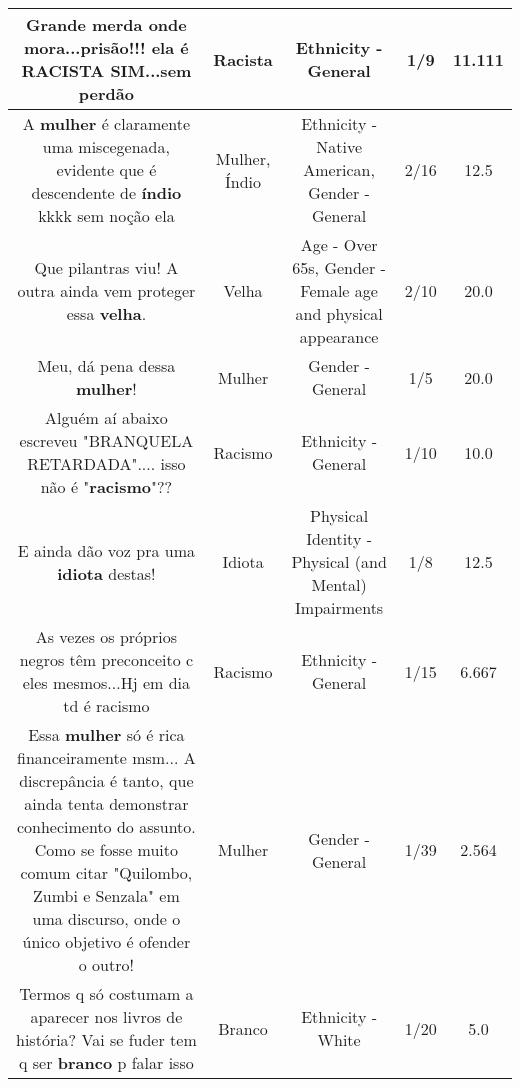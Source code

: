 \documentclass[11pt]{article}
\newlength\mylength
\begin{document}
\begin{center}
\begin{longtable}{|C{.65\mylength}|C{.30\mylength}|C{.12\mylength}|C{.12\mylength}|C{.12\mylength}|}
  \small Grande merda onde mora...prisão!!! ela é  \textbf{RACISTA} SIM...sem perdão\normalsize   & Racista & Ethnicity - General & 1/9 & 11.111 \\  \hline
  \small A \textbf{mulher} é claramente uma miscegenada, evidente que é descendente de \textbf{índio} kkkk sem noção ela\normalsize   & Mulher, Índio & Ethnicity - Native American, Gender - General & 2/16 & 12.5 \\  \hline
  \small Que pilantras viu! A outra ainda vem proteger essa \textbf{v\textbf{elha}}.\normalsize   & Velha & Age - Over 65s, Gender - Female age and physical appearance & 2/10 & 20.0 \\  \hline
  \small Meu, dá pena dessa \textbf{mulher}!\normalsize   & Mulher & Gender - General & 1/5 & 20.0 \\  \hline
  \small Alguém aí abaixo escreveu "BRANQUELA RETARDADA".... isso não é "\textbf{racismo}"??\normalsize   & Racismo & Ethnicity - General & 1/10 & 10.0 \\  \hline
  \small E ainda dão voz pra uma \textbf{idiota} destas!\normalsize   & Idiota & Physical Identity - Physical (and Mental) Impairments & 1/8 & 12.5 \\  \hline
  \small As vezes os próprios negros têm preconceito c eles mesmos...Hj em dia td é racismo\normalsize   & Racismo & Ethnicity - General & 1/15 & 6.667 \\  \hline
  \small Essa \textbf{mulher} só é rica financeiramente msm... A discrepância é tanto, que ainda tenta demonstrar conhecimento do assunto. Como se fosse muito comum citar "Quilombo, Zumbi e Senzala" em uma discurso, onde o único objetivo é ofender o outro!\normalsize   & Mulher & Gender - General & 1/39 & 2.564 \\  \hline
  \small Termos q só costumam a aparecer nos livros de história? Vai se fuder tem q ser \textbf{branco} p falar isso\normalsize   & Branco & Ethnicity - White & 1/20 & 5.0 \\  \hline

\end{longtable}
\end{center}
\end{document}
